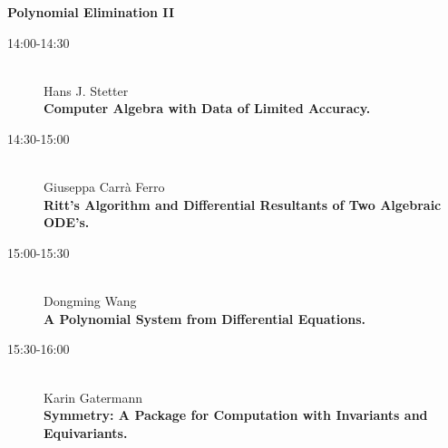 \begin{center}
{\Large \bf Polynomial Elimination II
}
\end{center}


\begin{description}
\item[14:00-14:30] \ \\
  Hans J. Stetter\\
  {\bf Computer Algebra with Data of Limited Accuracy.} 
\item[14:30-15:00] \ \\
  Giuseppa Carr\`a Ferro\\
  {\bf Ritt's Algorithm and Differential Resultants of Two Algebraic ODE's.} 
\item[15:00-15:30] \ \\
  Dongming Wang\\
  {\bf A Polynomial System from Differential Equations.} 
\item[15:30-16:00] \ \\
  Karin Gatermann\\
  {\bf Symmetry: A Package for Computation with Invariants and Equivariants.} 
\end{description}

